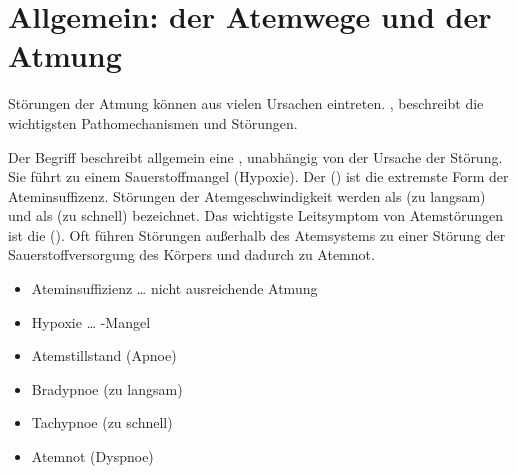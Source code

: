 \clearpage
{}





% 
% 
% 
% 

\section{Allgemein:  der Atemwege 
und der Atmung}
\label{topic:atemstörungen}
\label{topic:atemstillstand}

{%
%
%
%
%
%
%
Störungen der Atmung können aus vielen Ursachen eintreten.
, beschreibt die
wichtigsten Pathomechanismen und Störungen.

Der Begriff  beschreibt allgemein eine
, 
unabhängig von der Ursache der Störung. 
Sie führt zu einem Sauerstoffmangel (Hypoxie). 
Der  () ist die extremste Form
der Ateminsuffizenz. 
Störungen der Atemgeschwindigkeit
werden als  (zu langsam) und als 
(zu schnell) bezeichnet.
Das wichtigste Leitsymptom von Atemstörungen ist die  
().
Oft führen Störungen außerhalb des Atemsystems zu einer Störung der 
Sauerstoffversorgung des Körpers und dadurch zu Atemnot. 
}{
\begin{itemize}
  \item Ateminsuffizienz \ldots{} nicht ausreichende Atmung
  \item Hypoxie \ldots{} -Mangel
  \item Atemstillstand (Apnoe)
  \item Bradypnoe (zu langsam)
  \item Tachypnoe (zu schnell)
  \item Atemnot (Dyspnoe)
\end{itemize}
}{}{}{}


